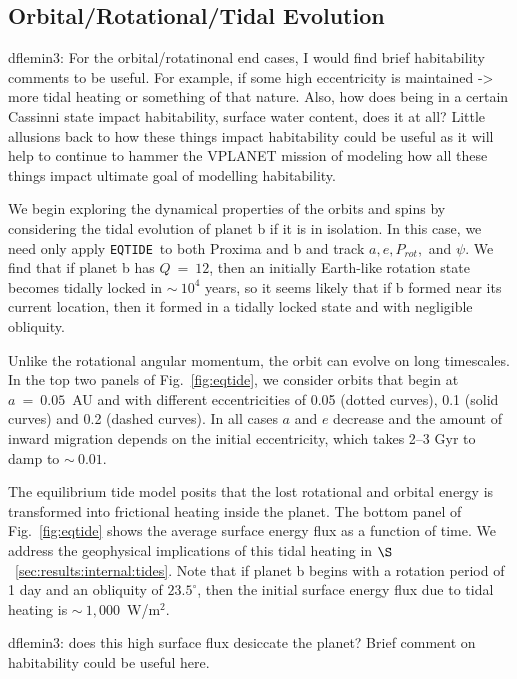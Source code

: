 \documentclass[preprint,12pt]{aastex}
\newcommand{\xxx}[1]{{\color{red} #1}} %
\def\eqtide{\texttt{\footnotesize{EQTIDE}}\xspace}
\begin{document}
\subsection{Orbital/Rotational/Tidal Evolution}
\label{sec:results:orbital}

\xxx{dflemin3: For the orbital/rotatinonal end cases, I would find brief habitability comments to be useful.  For example,
if some high eccentricity is maintained -> more tidal heating or something of that nature.  Also, how does being in a certain
Cassinni state impact habitability, surface water content, does it at all?  Little allusions back to how these things impact
habitability could be useful as it will help to continue to hammer the VPLANET mission of modeling how all these things
impact ultimate goal of modelling habitability.}

We begin exploring the dynamical properties of the orbits and spins by
considering the tidal evolution of planet b if it is in isolation. In
this case, we need only apply \eqtide~to both Proxima and b and track
$a, e, P_{rot},$ and $\psi$. We find that if planet b has $Q~=~12$,
then an initially Earth-like rotation state becomes tidally locked in
$\sim~10^4$ years, so it seems likely that if b formed near its
current location, then it formed in a tidally locked state and with
negligible obliquity.

Unlike the rotational angular momentum, the orbit can evolve
on long timescales. In the top two panels of Fig.~\ref{fig:eqtide}, we
consider orbits that begin at $a~=~0.05$~AU and with different
eccentricities of 0.05 (dotted curves), 0.1 (solid curves) and 0.2
(dashed curves). In all cases $a$ and $e$ decrease and the amount of
inward migration depends on the initial eccentricity, which takes 2--3
Gyr to damp to $\sim~0.01$.

The equilibrium tide model posits that the lost rotational and orbital
energy is transformed into frictional heating inside the planet. The
bottom panel of Fig.~\ref{fig:eqtide} shows the average surface energy
flux as a function of time. We address the geophysical implications of
this tidal heating in $\S$~\ref{sec:results:internal:tides}. Note that if planet
b begins with a rotation period of 1 day and an obliquity of
$23.5^\circ$, then the initial surface energy flux due to tidal
heating is $\sim~1,000$~W/m$^{2}$.

\xxx{dflemin3: does this high surface flux desiccate the planet?  Brief comment on habitability could be useful here.}
\end{document}
